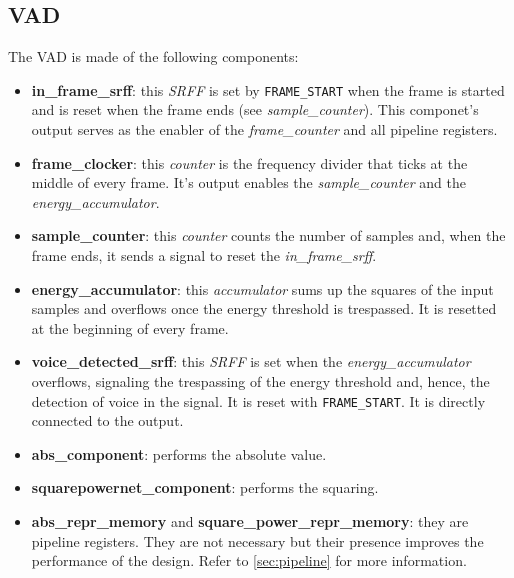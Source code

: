 \subsection{VAD}
The VAD is made of the following components:
\begin{itemize}
  \item \textbf{in\_frame\_srff}: this \emph{SRFF} is set by \texttt{FRAME\_START} when
    the frame is started and is reset when the frame ends (see \emph{sample\_counter}).
    This componet's output serves as the enabler of the \emph{frame\_counter}
    and all pipeline registers.
  \item \textbf{frame\_clocker}: this \emph{counter} is the frequency divider
    that ticks at the middle of every frame. It's output enables the
    \emph{sample\_counter} and the \emph{energy\_accumulator}.
  \item \textbf{sample\_counter}: this \emph{counter} counts the number of samples
    and, when the frame ends, it sends a signal to reset the \emph{in\_frame\_srff}.
  \item \textbf{energy\_accumulator}: this \emph{accumulator} sums up the
    squares of the input samples and overflows once the energy threshold is
    trespassed. It is resetted at the beginning of every frame.
  \item \textbf{voice\_detected\_srff}: this \emph{SRFF} is set when the
    \emph{energy\_accumulator} overflows, signaling the trespassing of the
    energy threshold and, hence, the detection of voice in the signal. It is
    reset with \texttt{FRAME\_START}. It is directly connected to the output.
  \item \textbf{abs\_component}: performs the absolute value.
  \item \textbf{squarepowernet\_component}: performs the squaring.
  \item \textbf{abs\_repr\_memory} and \textbf{square\_power\_repr\_memory}:
    they are pipeline registers. They are not necessary but their presence
    improves the performance of the design. Refer to \cref{sec:pipeline} for
    more information.
\end{itemize}

